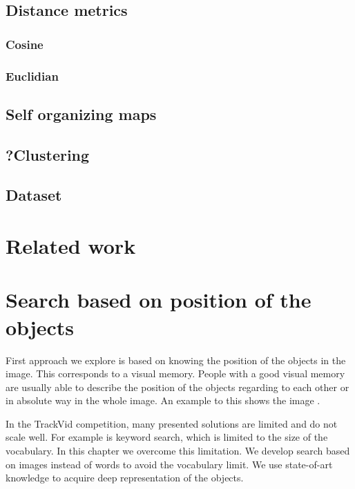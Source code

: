 \section{Distance metrics}
\subsection{Cosine}
\subsection{Euclidian}

\section{Self organizing maps}

\section{?Clustering}

\section{Dataset}

\chapter{Related work}


\chapter{Search based on position of the objects}

First approach we explore is based on knowing the position of the objects in the image. This corresponds to a visual memory. People with a good visual memory are usually able to describe the position of the objects regarding to each other or in absolute way in the whole image. An example to this shows the image \todo[]{}.




In the TrackVid competition, many presented solutions are limited and do not scale well. For example is keyword search, which is limited to the size of the vocabulary. In this chapter we overcome this limitation. We develop search based on images instead of words to avoid the vocabulary limit. We use state-of-art knowledge to acquire deep representation of the objects.

